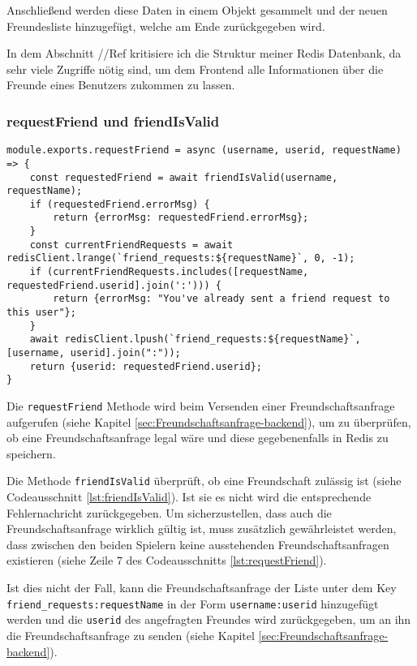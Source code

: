 Anschließend werden diese Daten in einem Objekt gesammelt und der neuen Freundesliste hinzugefügt, welche am Ende zurückgegeben wird.

In dem Abschnitt //Ref kritisiere ich die Struktur meiner Redis Datenbank, da sehr viele Zugriffe nötig sind, um dem Frontend alle Informationen über die Freunde eines Benutzers zukommen zu lassen.

\subsubsection{requestFriend und friendIsValid}
\label{sec:requestFriend}

\begin{lstlisting}[style=codeStyle, caption={requestFriend Methode um eine Freundschaftsanfrage in redis zu speichern}, label={lst:requestFriend}]
module.exports.requestFriend = async (username, userid, requestName) => {
    const requestedFriend = await friendIsValid(username, requestName);
    if (requestedFriend.errorMsg) {
        return {errorMsg: requestedFriend.errorMsg};
    }
    const currentFriendRequests = await redisClient.lrange(`friend_requests:${requestName}`, 0, -1);
    if (currentFriendRequests.includes([requestName, requestedFriend.userid].join(':'))) {
        return {errorMsg: "You've already sent a friend request to this user"};
    }
    await redisClient.lpush(`friend_requests:${requestName}`, [username, userid].join(":"));
    return {userid: requestedFriend.userid};
}
\end{lstlisting}

Die \verb|requestFriend| Methode wird beim Versenden einer Freundschaftsanfrage aufgerufen (siehe Kapitel \ref{sec:Freundschaftsanfrage-backend}), um zu überprüfen, ob eine Freundschaftsanfrage legal wäre und diese gegebenenfalls in Redis zu speichern.

Die Methode \verb|friendIsValid| überprüft, ob eine Freundschaft zulässig ist (siehe Codeausschnitt \ref{lst:friendIsValid}). Ist sie es nicht wird die entsprechende Fehlernachricht zurückgegeben. Um sicherzustellen, dass auch die Freundschaftsanfrage wirklich gültig ist, muss zusätzlich gewährleistet werden, dass zwischen den beiden Spielern keine ausstehenden Freundschaftsanfragen existieren (siehe Zeile 7 des Codeausschnitts \ref{lst:requestFriend}).

Ist dies nicht der Fall, kann die Freundschaftsanfrage der Liste unter dem Key \verb|friend_requests:requestName| in der Form \verb|username:userid| hinzugefügt werden und die \verb|userid| des angefragten Freundes wird zurückgegeben, um an ihn die Freundschaftsanfrage zu senden (siehe Kapitel \ref{sec:Freundschaftsanfrage-backend}).

